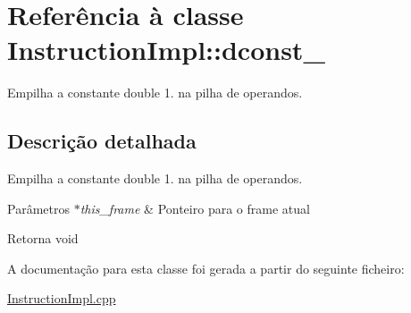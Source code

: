 \hypertarget{class_instruction_impl_1_1dconst__1}{}\section{Referência à classe Instruction\+Impl\+:\+:dconst\+\_}
\label{class_instruction_impl_1_1dconst__1}


Empilha a constante double 1. na pilha de operandos.  




\subsection{Descrição detalhada}
Empilha a constante double 1. na pilha de operandos. 


\begin{DoxyParams}{Parâmetros}
{\em $\ast$this\+\_\+frame} & Ponteiro para o frame atual \\
\hline
\end{DoxyParams}
\begin{DoxyReturn}{Retorna}
void 
\end{DoxyReturn}


A documentação para esta classe foi gerada a partir do seguinte ficheiro\+:\begin{DoxyCompactItemize}
\item 
\hyperlink{_instruction_impl_8cpp}{Instruction\+Impl.\+cpp}\end{DoxyCompactItemize}

